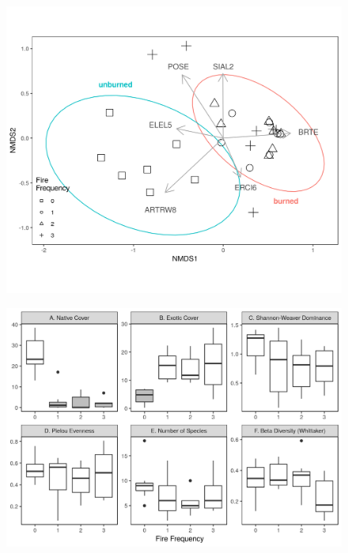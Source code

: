 \documentclass[]{article}
\begin{document}
\clearpage

\newpage

\begin{figure}
 
  \begin{center}
    \includegraphics{figures/nmds.png}
    \caption{}
  \end{center}
\end{figure}

\clearpage

\newpage

\begin{figure}
 
  \begin{center}
    \includegraphics{figures/tukey_plots.png}
    \caption{}
  \end{center}
\end{figure}
\end{document}
